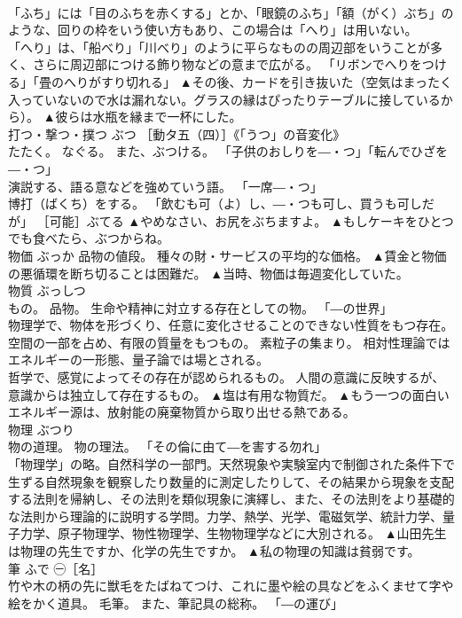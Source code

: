 \documentclass[8pt]{extreport}
\begin{document}
\begin{CJK}{UTF8}{min}
\\	「ふち」には「目のふちを赤くする」とか、「眼鏡のふち」「額（がく）ぶち」のような、回りの枠をいう使い方もあり、この場合は「へり」は用いない。 
\\	「へり」は、「船べり」「川べり」のように平らなものの周辺部をいうことが多く、さらに周辺部につける飾り物などの意まで広がる。 「リボンでへりをつける」「畳のへりがすり切れる」	▲その後、カードを引き抜いた（空気はまったく入っていないので水は漏れない。グラスの縁はぴったりテーブルに接しているから）。 ▲彼らは水瓶を縁まで一杯にした。
\\	打つ・撃つ・撲つ	ぶつ	［動タ五（四）］《「うつ」の音変化》 
\\	たたく。 なぐる。 また、ぶつける。 「子供のおしりを―・つ」「転んでひざを―・つ」 
\\	演説する、語る意などを強めていう語。 「一席―・つ」 
\\	博打（ばくち）をする。 「飲むも可（よ）し、―・つも可し、買うも可しだが」 ［可能］ぶてる	▲やめなさい、お尻をぶちますよ。 ▲もしケーキをひとつでも食べたら、ぶつからね。
\\	物価	ぶっか	品物の値段。 種々の財・サービスの平均的な価格。	▲賃金と物価の悪循環を断ち切ることは困難だ。 ▲当時、物価は毎週変化していた。
\\	物質	ぶっしつ	
\\	もの。 品物。 生命や精神に対立する存在としての物。 「―の世界」 
\\	物理学で、物体を形づくり、任意に変化させることのできない性質をもつ存在。 空間の一部を占め、有限の質量をもつもの。 素粒子の集まり。 相対性理論ではエネルギーの一形態、量子論では場とされる。 
\\	哲学で、感覚によってその存在が認められるもの。 人間の意識に反映するが、意識からは独立して存在するもの。	▲塩は有用な物質だ。 ▲もう一つの面白いエネルギー源は、放射能の廃棄物質から取り出せる熱である。
\\	物理	ぶつり	
\\	物の道理。 物の理法。 「その倫に由て―を害する勿れ」 
\\	「物理学」の略。自然科学の一部門。天然現象や実験室内で制御された条件下で生ずる自然現象を観察したり数量的に測定したりして、その結果から現象を支配する法則を帰納し、その法則を類似現象に演繹し、また、その法則をより基礎的な法則から理論的に説明する学問。力学、熱学、光学、電磁気学、統計力学、量子力学、原子物理学、物性物理学、生物物理学などに大別される。	▲山田先生は物理の先生ですか、化学の先生ですか。 ▲私の物理の知識は貧弱です。
\\	筆	ふで	㊀［名］ 
\\	竹や木の柄の先に獣毛をたばねてつけ、これに墨や絵の具などをふくませて字や絵をかく道具。 毛筆。 また、筆記具の総称。 「―の運び」 

\end{CJK}
\end{document}
